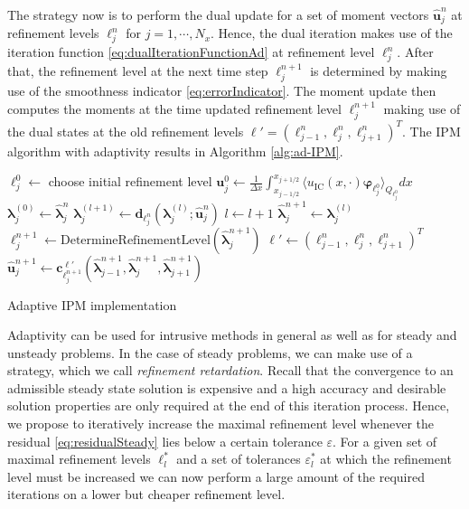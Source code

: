 The strategy now is to perform the dual update for a set of moment vectors $\bm{\hat u}_j^n$ at refinement levels $\ell_j^n$ for $j = 1,\cdots,N_x$. Hence, the dual iteration makes use of the iteration function \eqref{eq:dualIterationFunctionAd} at refinement level $\ell_j^n$. After that, the refinement level at the next time step $\ell_j^{n+1}$ is determined by making use of the smoothness indicator \eqref{eq:errorIndicator}. The moment update then computes the moments at the time updated refinement level $\ell_j^{n+1}$ making use of the dual states at the old refinement levels $\bm{\ell}' = (\ell_{j-1}^n,\ell_{j}^n,\ell_{j+1}^n)^T$. The IPM algorithm with adaptivity results in Algorithm \ref{alg:ad-IPM}.
\begin{algorithm}[H]
\begin{algorithmic}[1]
\State $\ell_j^0 \leftarrow$ choose initial refinement level
\State $\bm{u}_j^0 \leftarrow \frac{1}{\Delta x} \int_{x_{j-1/ 2}}^{x_{j+1/ 2}} \langle u_{\text{IC}}(x, \cdot) \bm{\varphi}_{\ell_j^0} \rangle_{Q_{\ell_j^0}} dx$
\EndFor
{}
\State $\bm{\lambda}_j^{(0)} \leftarrow \bm{\hat \lambda}_j^{n}$
\State $\bm{\lambda}_j^{(l+1)} \leftarrow \bm{d}_{\ell_j^n}(\bm{\lambda}_{j}^{(l)};\bm{\hat u}_j^{n})$
\State $l \leftarrow l+1$
\EndWhile
\State $\bm{\hat \lambda}_j^{n+1} \leftarrow \bm{\lambda}_j^{(l)}$
\State $\ell_j^{n+1}\leftarrow \text{DetermineRefinementLevel}\left(\bm{\hat \lambda}_j^{n+1}\right)$
\EndFor
{}
\State $\bm\ell' \leftarrow (\ell_{j-1}^n,\ell_{j}^n,\ell_{j+1}^n)^T$
\State $\bm{\hat u}_j^{n+1} \leftarrow \bm{c}_{\ell_j^{n+1}}^{\bm\ell'}(\bm{\hat \lambda}_{j-1}^{n+1},\bm{\hat \lambda}_j^{n+1},\bm{\hat \lambda}_{j+1}^{n+1})$
\EndFor
\EndFor
\end{algorithmic}
\caption{Adaptive IPM implementation}
\label{alg:ad-IPM}
\end{algorithm}
Adaptivity can be used for intrusive methods in general as well as for steady and unsteady problems. In the case of steady problems, we can make use of a strategy, which we call \textit{refinement retardation}. Recall that the convergence to an admissible steady state solution is expensive and a high accuracy and desirable solution properties are only required at the end of this iteration process. Hence, we propose to iteratively increase the maximal refinement level whenever the residual \eqref{eq:residualSteady} lies below a certain tolerance $\varepsilon$. For a given set of maximal refinement levels $\ell_l^*$ and a set of tolerances $\varepsilon_l^*$ at which the refinement level must be increased we can now perform a large amount of the required iterations on a lower but cheaper refinement level.
